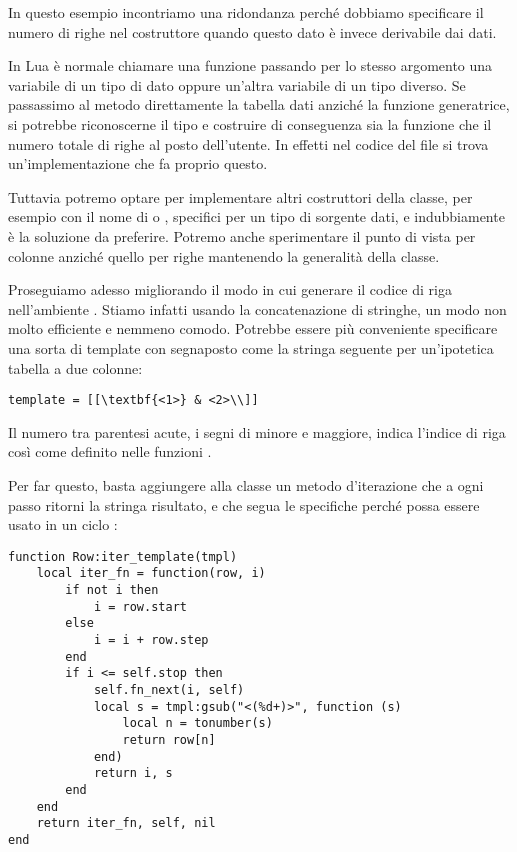 In questo esempio incontriamo una ridondanza perché dobbiamo specificare il
numero di righe nel costruttore  quando questo dato è invece
derivabile dai dati. 

In Lua è normale chiamare una funzione passando per lo stesso argomento una
variabile di un tipo di dato oppure un'altra variabile di un tipo diverso. Se
passassimo al metodo  direttamente la tabella dati anziché la funzione
generatrice, si potrebbe riconoscerne il tipo e costruire di conseguenza sia la
funzione  che il numero totale di righe al posto dell'utente. In
effetti nel codice del file  si trova un'implementazione
che fa proprio questo.

Tuttavia potremo optare per implementare altri costruttori della classe, per
esempio con il nome di  o , specifici per un tipo
di sorgente dati, e indubbiamente è la soluzione da preferire. Potremo anche
sperimentare il punto di vista per colonne anziché quello per righe mantenendo
la generalità della classe.

Proseguiamo adesso migliorando il modo in cui generare il codice di riga
nell'ambiente . Stiamo infatti usando la concatenazione di
stringhe, un modo non molto efficiente e nemmeno comodo. Potrebbe essere più
conveniente specificare una sorta di template con segnaposto come la stringa
seguente per un'ipotetica tabella a due colonne:
\begin{Verbatim}[numbers=none]
template = [[\textbf{<1>} & <2>\\]]
\end{Verbatim}

Il numero tra parentesi acute, i segni di minore e maggiore, indica l'indice di
riga così come definito nelle funzioni .

Per far questo, basta aggiungere alla classe  un metodo d'iterazione
che a ogni passo ritorni la stringa risultato, e che segua le specifiche perché
possa essere usato in un ciclo :
%
%
%
%
\begin{Verbatim}
function Row:iter_template(tmpl)
    local iter_fn = function(row, i)
        if not i then
            i = row.start
        else
            i = i + row.step
        end
        if i <= self.stop then
            self.fn_next(i, self)
            local s = tmpl:gsub("<(%d+)>", function (s)
                local n = tonumber(s)
                return row[n]
            end)
            return i, s
        end
    end
    return iter_fn, self, nil
end
\end{Verbatim}


